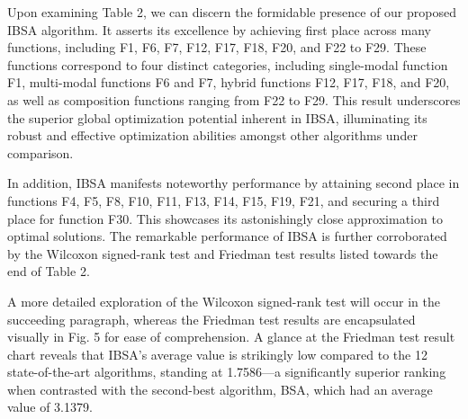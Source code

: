 \documentclass{article} %
\begin{document}
Upon examining Table 2, we can discern the formidable presence of our proposed IBSA algorithm. It asserts its excellence by achieving first place across many functions, including F1, F6, F7, F12, F17, F18, F20, and F22 to F29. These functions correspond to four distinct categories, including single-modal function F1, multi-modal functions F6 and F7, hybrid functions F12, F17, F18, and F20, as well as composition functions ranging from F22 to F29. This result underscores the superior global optimization potential inherent in IBSA, illuminating its robust and effective optimization abilities amongst other algorithms under comparison.

In addition, IBSA manifests noteworthy performance by attaining second place in functions F4, F5, F8, F10, F11, F13, F14, F15, F19, F21, and securing a third place for function F30. This showcases its astonishingly close approximation to optimal solutions. The remarkable performance of IBSA is further corroborated by the Wilcoxon signed-rank test and Friedman test results listed towards the end of Table 2.

A more detailed exploration of the Wilcoxon signed-rank test will occur in the succeeding paragraph, whereas the Friedman test results are encapsulated visually in Fig. 5 for ease of comprehension. A glance at the Friedman test result chart reveals that IBSA's average value is strikingly low compared to the 12 state-of-the-art algorithms, standing at 1.7586---a significantly superior ranking when contrasted with the second-best algorithm, BSA, which had an average value of 3.1379.
\end{document}
